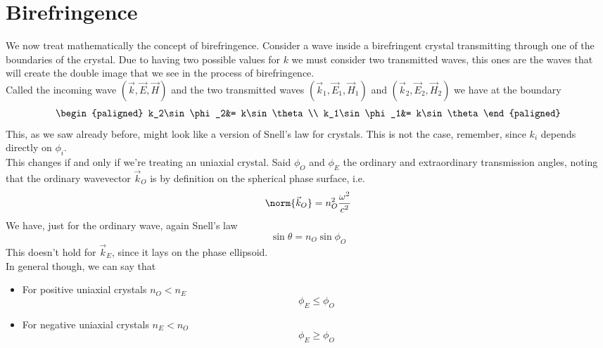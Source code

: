 \documentclass[../electromagnetism.tex]{subfiles}
\begin{document}
\section{Birefringence}
We now treat mathematically the concept of birefringence. Consider a wave inside a birefringent crystal transmitting through one of the boundaries of the crystal. Due to having two possible values for $k$ we must consider two transmitted waves, this ones are the waves that will create the double image that we see in the process of birefringence.\\
Called the incoming wave $\left( \vec{k},\vec{E},\vec{H} \right)$ and the two transmitted waves $\left( \vec{k}_1,\vec{E}_1,\vec{H}_1 \right)$ and $\left( \vec{k}_2,\vec{E}_2,\vec{H}_2 \right)$ we have at the boundary
\begin{equation*}
	\begin{paligned}
		k_2\sin\phi_2&= k\sin\theta\\
		k_1\sin\phi_1&= k\sin\theta
	\end{paligned}
\end{equation*}
This, as we saw already before, might look like a version of Snell's law for crystals. This is not the case, remember, since $k_{i}$ depends directly on $\phi_{i}$.\\
This changes if and only if we're treating an uniaxial crystal. Said $\phi_O$ and $\phi_E$ the ordinary and extraordinary transmission angles, noting that the ordinary wavevector $\vec{k}_O$ is by definition on the spherical phase surface, i.e.
\begin{equation*}
	\norm{\vec{k}_O}=n_O^2\frac{\omega^2}{c^2}
\end{equation*}
We have, just for the ordinary wave, again Snell's law
\begin{equation}
	\sin\theta=n_O\sin\phi_O
	\label{eq:ordinarysnell.cry}
\end{equation}
This doesn't hold for $\vec{k}_E$, since it lays on the phase ellipsoid.\\
In general though, we can say that
\begin{itemize}
\item For positive uniaxial crystals $n_O<n_E$
	\begin{equation*}
		\phi_E\le\phi_O
	\end{equation*}
\item For negative uniaxial crystals $n_E<n_O$
	\begin{equation*}
		\phi_E\ge\phi_O
	\end{equation*}
\end{itemize}
\end{document}
